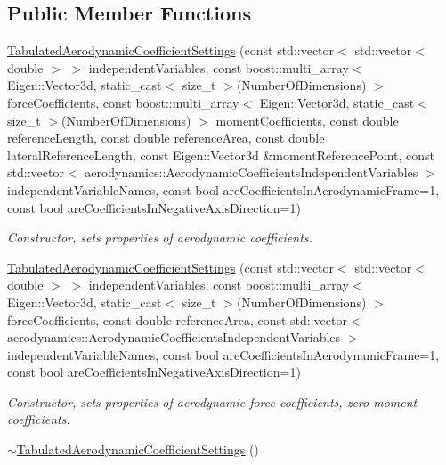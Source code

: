 \subsection*{Public Member Functions}
\begin{DoxyCompactItemize}
\item 
\hyperlink{classtudat_1_1simulation__setup_1_1TabulatedAerodynamicCoefficientSettings_a088786b5c951c0094e0dbb765a4f661b}{Tabulated\+Aerodynamic\+Coefficient\+Settings} (const std\+::vector$<$ std\+::vector$<$ double $>$ $>$ independent\+Variables, const boost\+::multi\+\_\+array$<$ Eigen\+::\+Vector3d, static\+\_\+cast$<$ size\+\_\+t $>$(Number\+Of\+Dimensions) $>$ force\+Coefficients, const boost\+::multi\+\_\+array$<$ Eigen\+::\+Vector3d, static\+\_\+cast$<$ size\+\_\+t $>$(Number\+Of\+Dimensions) $>$ moment\+Coefficients, const double reference\+Length, const double reference\+Area, const double lateral\+Reference\+Length, const Eigen\+::\+Vector3d \&moment\+Reference\+Point, const std\+::vector$<$ aerodynamics\+::\+Aerodynamic\+Coefficients\+Independent\+Variables $>$ independent\+Variable\+Names, const bool are\+Coefficients\+In\+Aerodynamic\+Frame=1, const bool are\+Coefficients\+In\+Negative\+Axis\+Direction=1)
\begin{DoxyCompactList}\small\item\em Constructor, sets properties of aerodynamic coefficients. \end{DoxyCompactList}\item 
\hyperlink{classtudat_1_1simulation__setup_1_1TabulatedAerodynamicCoefficientSettings_a9ba9e57bae2ef070d65cf355d84c26ad}{Tabulated\+Aerodynamic\+Coefficient\+Settings} (const std\+::vector$<$ std\+::vector$<$ double $>$ $>$ independent\+Variables, const boost\+::multi\+\_\+array$<$ Eigen\+::\+Vector3d, static\+\_\+cast$<$ size\+\_\+t $>$(Number\+Of\+Dimensions) $>$ force\+Coefficients, const double reference\+Area, const std\+::vector$<$ aerodynamics\+::\+Aerodynamic\+Coefficients\+Independent\+Variables $>$ independent\+Variable\+Names, const bool are\+Coefficients\+In\+Aerodynamic\+Frame=1, const bool are\+Coefficients\+In\+Negative\+Axis\+Direction=1)
\begin{DoxyCompactList}\small\item\em Constructor, sets properties of aerodynamic force coefficients, zero moment coefficients. \end{DoxyCompactList}\item 
\hyperlink{classtudat_1_1simulation__setup_1_1TabulatedAerodynamicCoefficientSettings_ab428d07da0aaea5cfe93ec2148959852}{$\sim$\+Tabulated\+Aerodynamic\+Coefficient\+Settings} ()\hypertarget{classtudat_1_1simulation__setup_1_1TabulatedAerodynamicCoefficientSettings_ab428d07da0aaea5cfe93ec2148959852}{}\label{classtudat_1_1simulation__setup_1_1TabulatedAerodynamicCoefficientSettings_ab428d07da0aaea5cfe93ec2148959852}


\end{DoxyCompactItemize}
